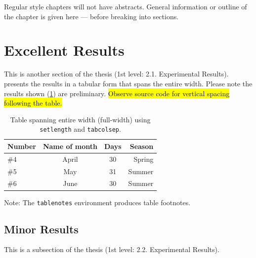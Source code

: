 \documentclass[ms-thesis,mathdesign,12pt]{ndsu-thesis-2022}
\begin{document}

Regular style chapters will not have abstracts. General information or outline of the chapter is given here --- before breaking into sections. 

\section{Excellent Results}
This is another section of the thesis (1st level: 2.1. Experimental Results). presents the results in a tabular form that spans the entire width. Please note the results shown (\cref{tab:2}) are preliminary. \hl{Observe source code for vertical spacing following the table.}

\begin{table}[ht]
\centering
\caption{Table spanning entire width (full-width) using \texttt{setlength} and
\texttt{tabcolsep}.}
\vspace{-1ex}
\setlength{\tabcolsep}{3.75em}
\begin{tabular}{@{\hspace{2ex}} lccr @{\hspace{2ex}}}
\toprule
Number & Name of month & Days & Season\\
\midrule
\#4 	& April  & 30		& Spring\\
\#5 	& May    & 31		& Summer\\
\#6 	& June   & 30		& Summer\\
\bottomrule
\end{tabular}
\begin{tablenotes}[flushleft]
\item \hspace{-1ex} Note: The \texttt{tablenotes} environment produces table footnotes. 
\end{tablenotes}
\label{tab:2}
\end{table}	

\vspace{-0.2in}
\kant[7-8]

\subsection{Minor Results}
This is a subsection of the thesis (1st level: 2.2. Experimental Results). 	
\end{document}
